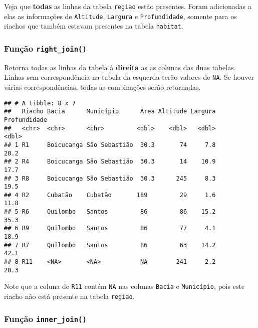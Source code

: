\documentclass[
]{book}
\newenvironment{Shaded}{\begin{snugshade}}{\end{snugshade}}
\newcommand{\DataTypeTok}[1]{\textcolor[rgb]{0.13,0.29,0.53}{#1}}
\newcommand{\KeywordTok}[1]{\textcolor[rgb]{0.13,0.29,0.53}{\textbf{#1}}}
\newcommand{\NormalTok}[1]{#1}
\newcommand{\OperatorTok}[1]{\textcolor[rgb]{0.81,0.36,0.00}{\textbf{#1}}}
\newcommand{\StringTok}[1]{\textcolor[rgb]{0.31,0.60,0.02}{#1}}
\begin{document}
Veja que \textbf{todas} as linhas da tabela \texttt{regiao} estão presentes. Foram adicionadas a elas as informações de \texttt{Altitude}, \texttt{Largura} e \texttt{Profundidade}, somente para os riachos que também estavam presentes na tabela \texttt{habitat}.

\hypertarget{funuxe7uxe3o-right_join}{%
\subsubsection{\texorpdfstring{Função \texttt{right\_join()}}{Função right\_join()}}\label{funuxe7uxe3o-right_join}}

Retorna todas as linhas da tabela à \textbf{direita} as as colunas das duas tabelas. Linhas sem correspondência na tabela da esquerda terão valores de \texttt{NA}. Se houver várias correspondências, todas as combinações serão retornadas.

\begin{Shaded}
\end{Shaded}

\begin{verbatim}
## # A tibble: 8 x 7
##   Riacho Bacia      Município      Área Altitude Largura Profundidade
##   <chr>  <chr>      <chr>         <dbl>    <dbl>   <dbl>        <dbl>
## 1 R1     Boicucanga São Sebastião  30.3       74     7.8         20.2
## 2 R4     Boicucanga São Sebastião  30.3       14    10.9         17.7
## 3 R8     Boicucanga São Sebastião  30.3      245     8.3         19.5
## 4 R2     Cubatão    Cubatão       189         29     1.6         11.8
## 5 R6     Quilombo   Santos         86         86    15.2         35.3
## 6 R9     Quilombo   Santos         86         77     4.1         18.9
## 7 R7     Quilombo   Santos         86         63    14.2         42.1
## 8 R11    <NA>       <NA>           NA        241     2.2         20.3
\end{verbatim}

Note que a coluna de \texttt{R11} contém \texttt{NA} nas colunas \texttt{Bacia} e \texttt{Município}, pois este riacho não está presente na tabela \texttt{regiao}.

\hypertarget{funuxe7uxe3o-inner_join}{%
\subsubsection{\texorpdfstring{Função \texttt{inner\_join()}}{Função inner\_join()}}\label{funuxe7uxe3o-inner_join}}
\end{document}
